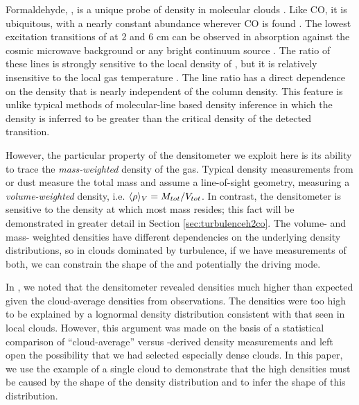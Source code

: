 Formaldehyde, \formaldehyde, is a unique probe of density in molecular clouds
\citep{Mangum1993b}.
Like CO, it is ubiquitous, with a nearly constant abundance wherever CO is
found \citep{Mangum1993a,Tang2013a}.  The lowest excitation transitions of
\ortho at 2 and 6 cm can be observed in absorption against the cosmic microwave
background or any bright continuum source \citep{Ginsburg2011a,Darling2012b}.
The ratio of these lines is strongly sensitive to the local density of \hh, but
it is relatively insensitive to the local gas temperature
\citep{Troscompt2009a,Wiesenfeld2013a}.  The \formaldehyde line ratio has a
direct dependence on the density that is nearly independent of the column
density.  This feature is unlike typical methods of molecular-line based density
inference in which the density is inferred to be greater than the critical density
of the detected transition.

However, the particular property of the \formaldehyde densitometer we exploit
here is its ability to trace the \emph{mass-weighted} density of the gas.
Typical density measurements from \thirteenco or dust measure the total mass
and assume a line-of-sight geometry, measuring a \emph{volume-weighted}
density, i.e. $\langle\rho\rangle_V = M_{tot}/V_{tot}$.  In contrast, the \formaldehyde
densitometer is sensitive to the density at which most mass resides;
this fact will be demonstrated in greater detail in Section \ref{sec:turbulenceh2co}.
The volume- and mass- weighted densities have different dependencies on the
underlying density distributions, so in clouds dominated by turbulence, if we
have measurements of both, we can constrain the shape of the \rhoPDF and
potentially the driving mode.

In \citet{Ginsburg2011a}, we noted that the \formaldehyde densitometer revealed
\hh densities much higher than expected given the cloud-average densities from
\thirteenco observations.  The densities were too high to be explained by a
lognormal density distribution consistent with that seen in local clouds.
However, this argument was made on the basis of a statistical comparison of
``cloud-average'' versus \formaldehyde-derived density measurements and left open
the possibility that we had selected especially dense clouds.  In this paper,
we use the example of a single cloud to demonstrate that the high \formaldehyde
densities must be caused by the shape of the density distribution and to infer the
shape of this distribution.

